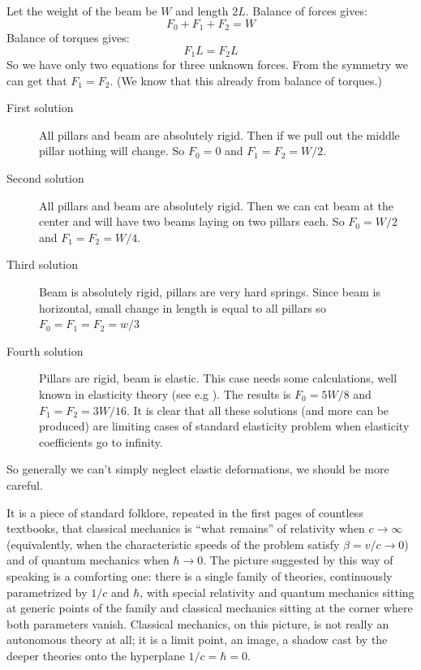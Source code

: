 Let the weight of the beam be $W$ and length $2 L$.
Balance of forces gives:
\begin{equation}
        F_0+F_1+F_2=W \label {bf}
\end{equation}
Balance of torques gives:
\begin{equation}
        F_1 L=F_2 L \label {bt}
\end{equation}
   So we have only two equations for three
unknown forces. From the symmetry we can get that $F_1=F_2$. 
(We know that this already from balance of torques.)
\begin{description}
    \item [First solution] All pillars and beam are absolutely rigid. Then
if we pull out the middle pillar nothing will change.
So $F_0=0$ and $F_1=F_2=W/2$.
    \item [Second solution] All pillars and beam are absolutely rigid. Then
we can cat beam at the center and will have two
beams laying on two pillars each.
So $F_0=W/2$ and $F_1=F_2=W/4$.
    \item [Third solution] Beam is absolutely rigid, pillars are very hard springs.
Since beam is horizontal, small change in length is 
equal to all pillars so $F_0=F_1=F_2=w/3$
    \item [Fourth solution] Pillars are rigid, beam is elastic. This case needs
some calculations, well known in elasticity theory
(see e.g \cite {LandauLifshitz-7}).
The results is $F_0=5 W/8$ and $F_1=F_2=3 W/16$.
It is clear that all these solutions (and more can be
produced) are limiting cases of standard elasticity 
problem when elasticity coefficients go to infinity.
\end{description}
So generally we can't simply neglect elastic deformations,
we should be more careful.

It is a piece of standard folklore, repeated in the first pages of countless
textbooks, that classical mechanics is ``what remains'' of relativity when
$c\to\infty$ (equivalently, when the characteristic speeds of the problem
satisfy $\beta = v/c \to 0$) and of quantum mechanics when $\hbar\to 0$. The
picture suggested by this way of speaking is a comforting one: there is a
single family of theories, continuously parametrized by $1/c$ and $\hbar$, with
special relativity and quantum mechanics sitting at generic points of the
family and classical mechanics sitting at the corner where both parameters
vanish. Classical mechanics, on this picture, is not really an autonomous
theory at all; it is a limit point, an image, a shadow cast by the deeper
theories onto the hyperplane $1/c=\hbar=0$.

